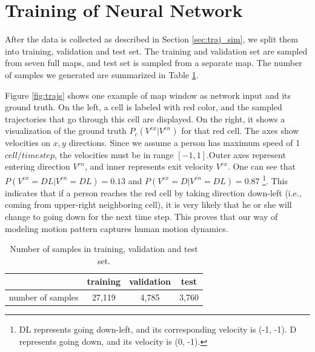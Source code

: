 \section{Training of Neural Network} \label{sec:train_cnn}

After the data is collected as described in Section \ref{sec:traj_sim}, we split them into training, validation and test set. The training and validation set are sampled from seven full maps, and test set is sampled from a separate map. The number of samples we generated are summarized in Table \ref{table:nos}. 

Figure \ref{fig:trajs} shows one example of map window as network input and its ground truth. On the left, a cell is labeled with red color, and the sampled trajectories that go through this cell are displayed. On the right, it shows a visualization of the ground truth \( P_c(V^{ex} | V^{en}) \) for that red cell. The axes show velocities on \( x, y\) directions. Since we assume a person has maximum speed of 1 $cell/timestep$, the velocities must be in range $[-1,1]. $Outer axes represent entering direction \( V^{en} \), and inner represents exit velocity \( V^{ex} \). One can see that \( P(V^{ex}=DL | V^{en}=DL) = 0.13 \) and \( P(V^{ex}=D | V^{en}=DL) = 0.87 \) \footnote{DL represents going down-left, and its corresponding velocity is (-1, -1). D represents going down, and its velocity is (0, -1).}. This indicates that if a person reaches the red cell by taking direction down-left (i.e., coming from upper-right neighboring cell), it is very likely that he or she will change to going down for the next time step. This proves that our way of modeling motion pattern captures human motion dynamics.

\begin{table}[H]
\centering
  \begin{tabular}{c|ccc}
    \hline
     & training & validation & test \\ \hline
    number of samples & 27,119 & 4,785 & 3,760\\
    \hline
  \end{tabular}
\caption{Number of samples in training, validation and test set.}
\label{table:nos}
\end{table}

